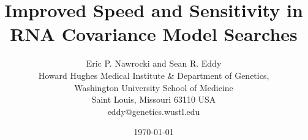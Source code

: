 \documentclass[11pt]{article}
\begin{document}
\title{Improved Speed and Sensitivity in RNA Covariance Model Searches}
\author{Eric P. Nawrocki and Sean R. Eddy\\
Howard Hughes Medical Institute \& Department of Genetics, \\
Washington University School of Medicine \\
Saint Louis, Missouri 63110 USA \\
eddy@genetics.wustl.edu}  
\date{\today}
\maketitle

\end{document}
